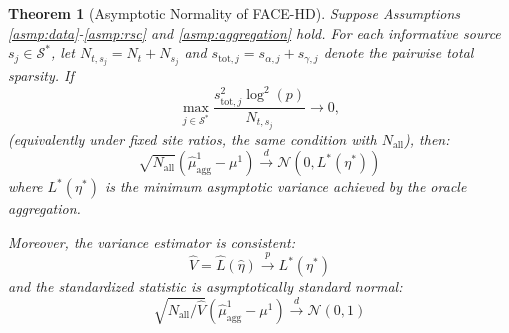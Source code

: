 \documentclass{article}
\newtheorem{theorem}{Theorem}[section]
\begin{document}
\begin{theorem}[Asymptotic Normality of FACE-HD]\label{thm:face_hd}
Suppose Assumptions \ref{asmp:data}-\ref{asmp:rsc} and \ref{asmp:aggregation} hold. For each informative source $s_j \in \mathcal{S}^*$, let $N_{t,s_j}=N_t+N_{s_j}$ and $s_{\mathrm{tot},j}=s_{\alpha,j}+s_{\gamma,j}$ denote the pairwise total sparsity. If
\[
\max_{j\in\mathcal{S}^*}\frac{s_{\mathrm{tot},j}^2\log^2(p)}{N_{t,s_j}} \to 0,
\]
(equivalently under fixed site ratios, the same condition with $N_{\mathrm{all}}$), then:
\[
\sqrt{N_{\mathrm{all}}}\left( \widehat{\mu}^1_{\text{agg}} - \mu^1 \right) \xrightarrow{d} \mathcal{N}(0, L^*(\eta^*))
\]
where $L^*(\eta^*)$ is the minimum asymptotic variance achieved by the oracle aggregation.

Moreover, the variance estimator is consistent:
\[
\widehat{V} = \widehat{L}(\widehat{\eta}) \xrightarrow{p} L^*(\eta^*)
\]
and the standardized statistic is asymptotically standard normal:
\[
\sqrt{N_{\mathrm{all}} / \widehat{V}} \left( \widehat{\mu}^1_{\text{agg}} - \mu^1 \right) \xrightarrow{d} \mathcal{N}(0, 1)
\]
\end{theorem}
\end{document}
